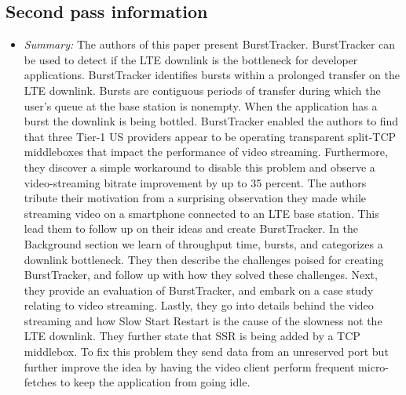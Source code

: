 \documentclass[letterpaper,twocolumn,10pt]{article}
\begin{document}
\subsection{Second pass information}
\label{sec:second}
\begin{itemize}

\item {\it Summary:} 
The authors of this paper present BurstTracker. BurstTracker can be used to detect if the LTE downlink
is the bottleneck for developer applications. BurstTracker identifies bursts within a prolonged transfer 
on the LTE downlink. Bursts are contiguous periods of transfer during which the user's queue at the base
station is nonempty. When the application has a burst the downlink is being bottled. BurstTracker enabled
the authors to find that three Tier-1 US providers appear to be operating transparent split-TCP middleboxes
that impact the performance of video streaming. Furthermore, they discover a simple workaround to 
disable this problem and observe a video-streaming bitrate improvement by up to 35 percent. The authors
tribute their motivation from a surprising observation they made while streaming video on a smartphone 
connected to an LTE base station. This lead them to follow up on their ideas and create BurstTracker. 
In the Background section we learn of throughput time, bursts, and categorizes a downlink bottleneck.
They then describe the challenges poised for creating BurstTracker, and follow up with how they solved
these challenges. Next, they provide an evaluation of BurstTracker, and embark on a case study relating 
to video streaming. Lastly, they go into details behind the video streaming and how Slow Start Restart 
is the cause of the slowness not the LTE downlink. They further state that SSR is being added by a TCP
middlebox. To fix this problem they send data from an unreserved port but further improve the idea by having
the video client perform frequent micro-fetches to keep the application from going idle.

\end{itemize}
\end{document}
